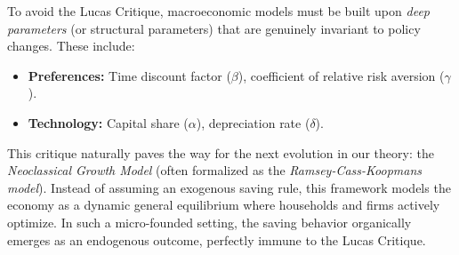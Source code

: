 To avoid the Lucas Critique, macroeconomic models must be built upon \textit{deep parameters} (or structural parameters) that are genuinely invariant to policy changes. These include:
\begin{itemize}
    \item \textbf{Preferences:} Time discount factor ($\beta$), coefficient of relative risk aversion ($\gamma$).
    \item \textbf{Technology:} Capital share ($\alpha$), depreciation rate ($\delta$).
\end{itemize}

This critique naturally paves the way for the next evolution in our theory: the \textit{Neoclassical Growth Model} (often formalized as the \textit{Ramsey-Cass-Koopmans model}). Instead of assuming an exogenous saving rule, this framework models the economy as a dynamic general equilibrium where households and firms actively optimize. In such a micro-founded setting, the saving behavior organically emerges as an endogenous outcome, perfectly immune to the Lucas Critique.

